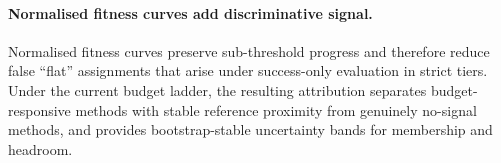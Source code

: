 \paragraph{Normalised fitness curves add discriminative signal.} Normalised fitness curves preserve sub-threshold progress and therefore reduce false ``flat'' assignments that arise under success-only evaluation in strict tiers. Under the current budget ladder, the resulting attribution separates budget-responsive methods with stable reference proximity from genuinely no-signal methods, and provides bootstrap-stable uncertainty bands for membership and headroom.
